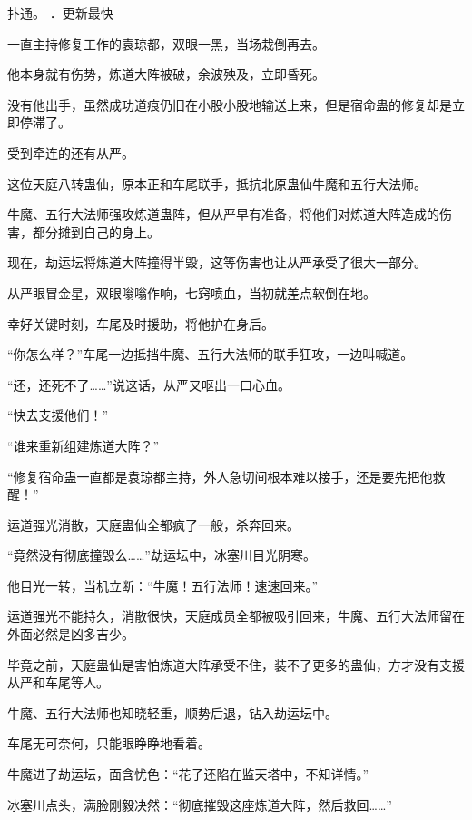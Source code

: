 
\begin{this_body}



扑通。 ．更新最快

一直主持修复工作的袁琼都，双眼一黑，当场栽倒再去。

他本身就有伤势，炼道大阵被破，余波殃及，立即昏死。

没有他出手，虽然成功道痕仍旧在小股小股地输送上来，但是宿命蛊的修复却是立即停滞了。

受到牵连的还有从严。

这位天庭八转蛊仙，原本正和车尾联手，抵抗北原蛊仙牛魔和五行大法师。

牛魔、五行大法师强攻炼道蛊阵，但从严早有准备，将他们对炼道大阵造成的伤害，都分摊到自己的身上。

现在，劫运坛将炼道大阵撞得半毁，这等伤害也让从严承受了很大一部分。

从严眼冒金星，双眼嗡嗡作响，七窍喷血，当初就差点软倒在地。

幸好关键时刻，车尾及时援助，将他护在身后。

“你怎么样？”车尾一边抵挡牛魔、五行大法师的联手狂攻，一边叫喊道。

“还，还死不了……”说这话，从严又呕出一口心血。

“快去支援他们！”

“谁来重新组建炼道大阵？”

“修复宿命蛊一直都是袁琼都主持，外人急切间根本难以接手，还是要先把他救醒！”

运道强光消散，天庭蛊仙全都疯了一般，杀奔回来。

“竟然没有彻底撞毁么……”劫运坛中，冰塞川目光阴寒。

他目光一转，当机立断：“牛魔！五行法师！速速回来。”

运道强光不能持久，消散很快，天庭成员全都被吸引回来，牛魔、五行大法师留在外面必然是凶多吉少。

毕竟之前，天庭蛊仙是害怕炼道大阵承受不住，装不了更多的蛊仙，方才没有支援从严和车尾等人。

牛魔、五行大法师也知晓轻重，顺势后退，钻入劫运坛中。

车尾无可奈何，只能眼睁睁地看着。

牛魔进了劫运坛，面含忧色：“花子还陷在监天塔中，不知详情。”

冰塞川点头，满脸刚毅决然：“彻底摧毁这座炼道大阵，然后救回……”


\end{this_body}
